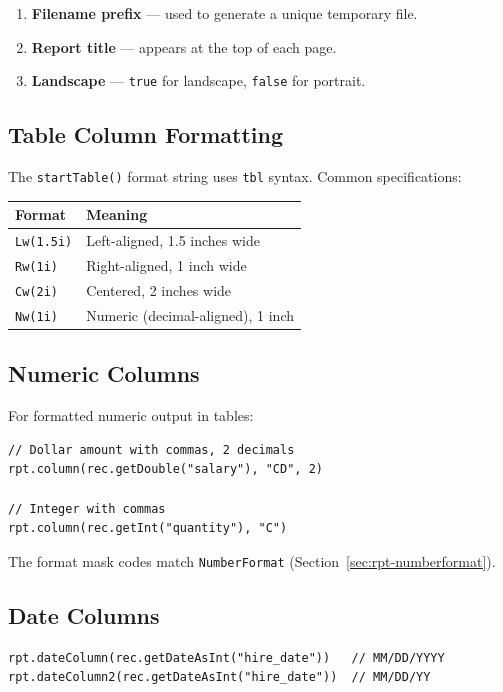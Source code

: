 \begin{enumerate}
  \item \textbf{Filename prefix} --- used to generate a unique temporary file.
  \item \textbf{Report title} --- appears at the top of each page.
  \item \textbf{Landscape} --- \texttt{true} for landscape, \texttt{false} for portrait.
\end{enumerate}

\subsection{Table Column Formatting}

The \texttt{startTable()} format string uses \texttt{tbl} syntax.  Common specifications:

\begin{longtable}{P{3.8cm}P{6.7cm}}
\toprule
\textbf{Format} & \textbf{Meaning} \\
\midrule
\endhead
\texttt{Lw(1.5i)} & Left-aligned, 1.5 inches wide \\
\texttt{Rw(1i)} & Right-aligned, 1 inch wide \\
\texttt{Cw(2i)} & Centered, 2 inches wide \\
\texttt{Nw(1i)} & Numeric (decimal-aligned), 1 inch \\
\bottomrule
\end{longtable}

\subsection{Numeric Columns}

For formatted numeric output in tables:

\begin{lstlisting}[style=groovy]
// Dollar amount with commas, 2 decimals
rpt.column(rec.getDouble("salary"), "CD", 2)

// Integer with commas
rpt.column(rec.getInt("quantity"), "C")
\end{lstlisting}

\noindent
The format mask codes match \texttt{NumberFormat} (Section~\ref{sec:rpt-numberformat}).

\subsection{Date Columns}

\begin{lstlisting}[style=groovy]
rpt.dateColumn(rec.getDateAsInt("hire_date"))   // MM/DD/YYYY
rpt.dateColumn2(rec.getDateAsInt("hire_date"))  // MM/DD/YY
\end{lstlisting}

